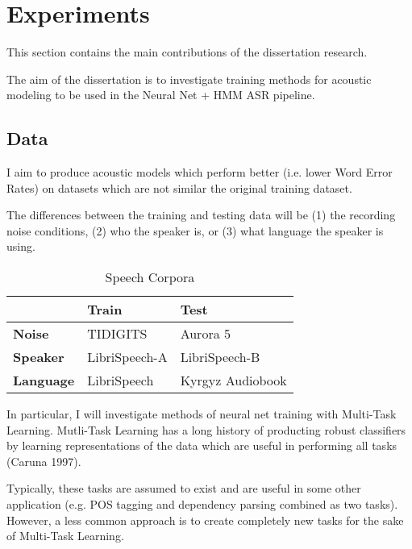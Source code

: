 \documentclass[10pt,a4paper]{article}
\begin{document}
\section{Experiments}

This section contains the main contributions of the dissertation research.

The aim of the dissertation is to investigate training methods for acoustic modeling to be used in the Neural Net + HMM ASR pipeline.

\subsection{Data}
I aim to produce acoustic models which perform better (i.e. lower Word Error Rates) on datasets which are not similar the original training dataset.

The differences between the training and testing data will be (1) the recording noise conditions, (2) who the speaker is, or (3) what language the speaker is using.


\begin{table}[htbp]
  \centering
  \begin{adjustbox}{width=.5\textwidth}
    \begin{tabular}{lll}
      \toprule
      & \textbf{Train} & \textbf{Test}\\
      \midrule
      \textbf{Noise} & TIDIGITS & Aurora 5 \\
      \textbf{Speaker} & LibriSpeech-A & LibriSpeech-B \\
      \textbf{Language} & LibriSpeech & Kyrgyz Audiobook \\
      \bottomrule
    \end{tabular}
    \label{table:data}
  \end{adjustbox}
  
  \caption{Speech Corpora}
  
\end{table}



In particular, I will investigate methods of neural net training with Multi-Task Learning. Mutli-Task Learning has a long history of producting robust classifiers by learning representations of the data which are useful in performing all tasks (Caruna 1997).

Typically, these tasks are assumed to exist and are useful in some other application (e.g. POS tagging and dependency parsing combined as two tasks). However, a less common approach is to create completely new tasks for the sake of Multi-Task Learning.
\end{document}
